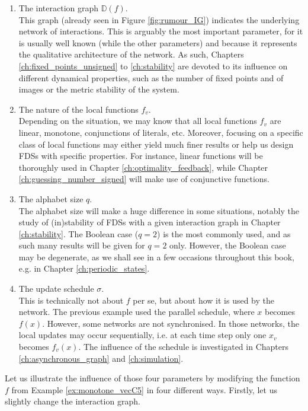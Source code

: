 \documentclass[a4paper, 11pt]{book}
\numberwithin{equation}{section}
\theoremstyle{plain}
\newcommand{\IG}{\mathbb{D}}
\renewcommand{\(}{\ldbrack}
\renewcommand{\)}{\rdbrack}
\begin{document}
\begin{enumerate}
	\item The interaction graph $\IG(f)$.\\
	This graph (already seen in Figure \ref{fig:rumour_IG}) indicates the underlying network of interactions. This is arguably the most important parameter, for it is usually well known (while the other parameters) and because it represents the qualitative architecture of the network. As such, Chapters \ref{ch:fixed_points_unsigned} to \ref{ch:stability} are devoted to its influence on different dynamical properties, such as the number of fixed points and of images or the metric stability of the system.
	
	\item The nature of the local functions $f_v$.\\
	Depending  on the situation, we may know that all local functions $f_v$ are linear, monotone, conjunctions of literals, etc. Moreover, focusing on a specific class of local functions may either yield much finer results or help us design FDSs with specific properties. For instance, linear functions will be thoroughly used in Chapter \ref{ch:optimality_feedback}, while Chapter \ref{ch:guessing_number_signed} will make use of conjunctive functions.
	
	\item The alphabet size $q$.\\
	The alphabet size will make a huge difference in some situations, notably the study of (in)stability of FDSs with a given interaction graph in Chapter \ref{ch:stability}. The Boolean case ($q=2$) is the most commonly used, and as such many results will be given for $q=2$ only. However, the Boolean case may be degenerate, as we shall see in a few occasions throughout this book, e.g. in Chapter \ref{ch:periodic_states}.
	
	\item The update schedule $\sigma$.\\
	This is technically not about $f$ per se, but about how it is used by the network. The previous example used the parallel schedule, where $x$ becomes $f(x)$. However, some networks are not synchronised. In those networks, the local updates may occur sequentially, i.e. at each time step only one $x_v$ becomes $f_v(x)$. The influence of the schedule is investigated in Chapters \ref{ch:asynchronous_graph} and \ref{ch:simulation}.
\end{enumerate}


Let us illustrate the influence of those four parameters by modifying the function $f$ from Example \ref{ex:monotone_vecC5} in four different ways. Firstly, let us slightly change the interaction graph.
\end{document}
